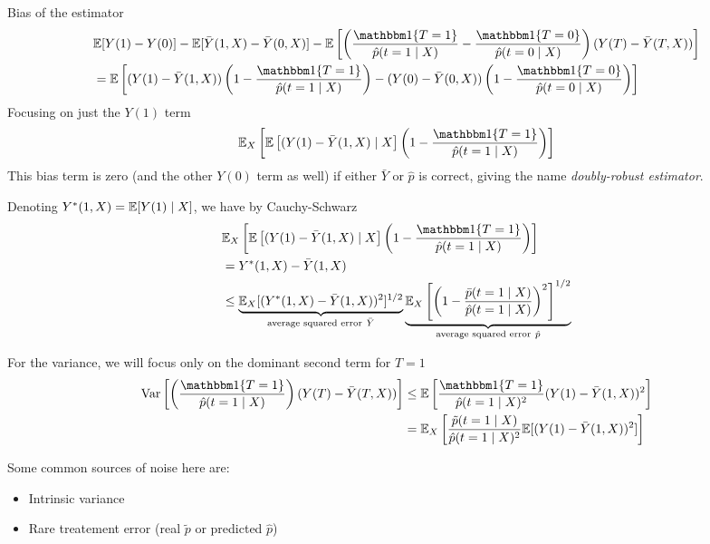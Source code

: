 Bias of the estimator
\begin{align}
  &\ex[Y(1) - Y(0)]
  - \ex[\bar{Y}(1,X) - \bar{Y}(0, X)]
  - \ex\left[\left(
      \frac{\ind\{T=1\}}{\hat{p}(t=1 \mid X)}
      - \frac{\ind\{T=0\}}{\hat{p}(t=0 \mid X)}
    \right) ( Y(T) - \bar{Y}(T, X) )
  \right] \\
  &= \ex\left[
    (Y(1) - \bar{Y}(1, X)) \left( 1 - \frac{\ind\{T=1\}}{\hat{p}(t=1 \mid X)} \right)
    - (Y(0) - \bar{Y}(0, X)) \left( 1 - \frac{\ind\{T=0\}}{\hat{p}(t=0 \mid X)} \right)
  \right]
\end{align}
Focusing on just the $Y(1)$ term
\begin{align}
  \ex_X\left[
    \ex\left[ (Y(1) - \bar{Y}(1, X) \mid X \right]  \left( 1 - \frac{\ind\{T=1\}}{\hat{p}(t=1 \mid X)} \right)
  \right]
\end{align}
This bias term is zero (and the other $Y(0)$ term as well)
if either $\bar{Y}$ or $\hat{p}$ is correct, giving the name
\emph{doubly-robust estimator}.

Denoting $Y^*(1, X) = \mathbb{E}[Y(1) \mid X]$, we have
by Cauchy-Schwarz
\begin{align}
  &\ex_X\left[
    \ex\left[ (Y(1) - \bar{Y}(1, X) \mid X \right]  \left( 1 - \frac{\ind\{T=1\}}{\hat{p}(t=1 \mid X)} \right)
  \right] \\
  &= Y^*(1, X) - \bar{Y}(1, X) \\
  &\leq
  \underbrace{\ex_X[(Y^*(1, X) - \bar{Y}(1, X))^2]^{1/2}}_{\text{average squared error}~\bar{Y}}
  \underbrace{\ex_X\left[
      \left(1 - \frac{\bar{p}(t=1 \mid X)}{\hat{p}(t=1 \mid X)} \right)^2
  \right]^{1/2}}_{\text{average squared error}~\hat{p}}
\end{align}

For the variance, we will focus only on the dominant second term for $T=1$
\begin{align}
  \Var\left[\left(
      \frac{\ind\{T=1\}}{\hat{p}(t=1 \mid X)}
      \right) ( Y(T) - \bar{Y}(T, X) )
  \right]
  &\leq \ex\left[
      \frac{\ind\{T=1\}}{\hat{p}(t=1 \mid X)^2}
      ( Y(1) - \bar{Y}(1, X) )^2
  \right] \\
  &= \ex_X\left[
      \frac{\tilde{p}(t=1 \mid X)}{\hat{p}(t=1 \mid X)^2}
    \ex[( Y(1) - \bar{Y}(1, X) )^2]
  \right]
\end{align}

Some common sources of noise here are:
\begin{itemize}
  \item Intrinsic variance
  \item Rare treatement error (real $\tilde{p}$ or predicted $\hat{p}$)
\end{itemize}

